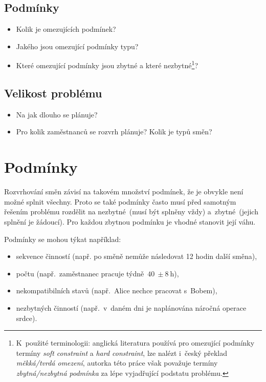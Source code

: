 \documentclass[a4paper,11pt,openany,twoside]{book}
\begin{document}
\subsection*{Podmínky}
\begin{itemize}
	\item Kolik je omezujících podmínek?
	\item Jakého jsou omezující podmínky typu?
	\item Které omezující podmínky jsou zbytné a které nezbytné\footnote{K~použité terminologii: anglická literatura používá pro omezující podmínky termíny \textit{soft constraint} a \textit{hard constraint}, lze nalézt i~český překlad \textit{měkká/tvrdá omezení}, autorka této práce však považuje termíny \textit{zbytná/nezbytná podmínka} za lépe vyjadřující podstatu problému.}?
\end{itemize}


\subsection*{Velikost problému}
\begin{itemize}
	\item Na jak dlouho se plánuje?
	\item Pro kolik zaměstnanců se rozvrh plánuje? Kolik je typů směn?
\end{itemize}



\section{Podmínky}
\label{sec:constraints}
Rozvrhování směn závisí na takovém množství podmínek, že je obvykle není možné splnit všechny. Proto se také podmínky často musí před samotným řešením problému rozdělit na nezbytné~(musí být splněny vždy) a~zbytné~(jejich splnění je žádoucí). \cite{todorovic2012bee} Pro každou zbytnou podmínku je vhodné stanovit její váhu. \cite{buyukozkan2014applicability}

Podmínky se mohou týkat například:
\begin{itemize}
	\item sekvence činností (např. po směně nemůže následovat 12 hodin další směna),
	\item počtu (např.~zaměstnanec pracuje týdně~$ 40~\pm 8~\mbox{h}$),
	\item nekompatibilních stavů (např.~Alice nechce pracovat s~Bobem),
	\item nezbytných činností (např.~v~daném dni je naplánována náročná operace srdce).
\end{itemize}
\end{document}
